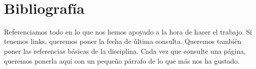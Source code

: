 \newpage
~
\newpage
\section{Bibliografía}
Referenciamos todo en lo que nos hemos apoyado a la hora de hacer el trabajo. Si tenemos links, queremos poner la fecha de última consulta.
Queremos también poner las referencias básicas de la disciplina. Cada vez que consulte una página, queremos ponerla aquí con un pequeño párrafo de lo que más nos ha gustado.
